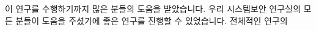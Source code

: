 \acknowledgement[korean]
이 연구를 수행하기까지 많은 분들의 도움을 받았습니다. 우리 시스템보안 연구실의
모든 분들이 도움을 주셨기에 좋은 연구를 진행할 수 있었습니다.  전체적인 연구의



